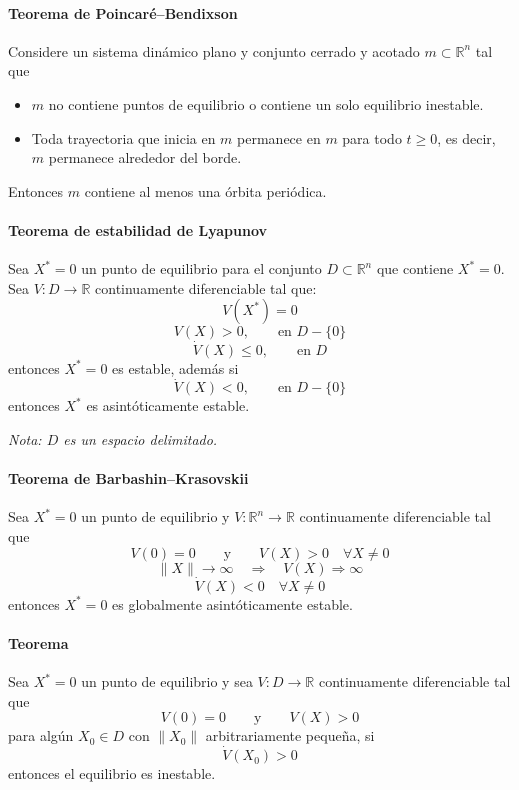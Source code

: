 \begin{flushright}
\end{flushright}

\paragraph{Teorema de Poincaré--Bendixson}
Considere un sistema dinámico plano y conjunto cerrado y acotado
$m\subset\mathbb{R}^{n}$ tal que

\begin{itemize}
  \item $m$ no contiene puntos de equilibrio o contiene un solo equilibrio
  inestable.
  \item Toda trayectoria que inicia en $m$ permanece en $m$ para todo
  $t\geq 0$, es decir, $m$ permanece alrededor del borde.
\end{itemize}

Entonces $m$ contiene al menos una órbita periódica.

\paragraph{Teorema de estabilidad de Lyapunov}
Sea $X^{*}=0$ un punto de equilibrio para el conjunto
$D\subset\mathbb{R}^{n}$ que contiene $X^{*}=0$. Sea
$V\colon D\to\mathbb{R}$ continuamente diferenciable tal que:
\[
  V(X^{*})=0
\]
\[
  V(X)>0, \qquad \text{en }D-\{0\}
\]
\[
  \dot{V}(X)\leq 0, \qquad \text{en }D
\]
entonces $X^{*}=0$ es estable, además si
\[
  \dot{V}(X)<0, \qquad \text{en }D-\{0\}
\]
entonces $X^{*}$ es asintóticamente estable.

\textit{Nota: $D$ es un espacio delimitado.}

\paragraph{Teorema de Barbashin--Krasovskii}
Sea $X^{*}=0$ un punto de equilibrio y
$V\colon\mathbb{R}^{n}\to\mathbb{R}$ continuamente diferenciable tal que
\[
  V(0)=0
  \qquad\text{y}\qquad
  V(X)>0 \quad \forall X\neq 0
\]
\[
  \lVert X\rVert\to\infty
  \quad\Rightarrow\quad
  V(X)\Rightarrow\infty
\]
\[
  \dot{V}(X)<0 \quad \forall X\neq 0
\]
entonces $X^{*}=0$ es globalmente asintóticamente estable.

\paragraph{Teorema}
Sea $X^{*}=0$ un punto de equilibrio y sea
$V\colon D\to\mathbb{R}$ continuamente diferenciable tal que
\[
  V(0)=0
  \qquad\text{y}\qquad
  V(X)>0
\]
para algún $X_0\in D$ con $\lVert X_0\rVert$ arbitrariamente pequeña, si
\[
  \dot{V}(X_0)>0
\]
entonces el equilibrio es inestable.